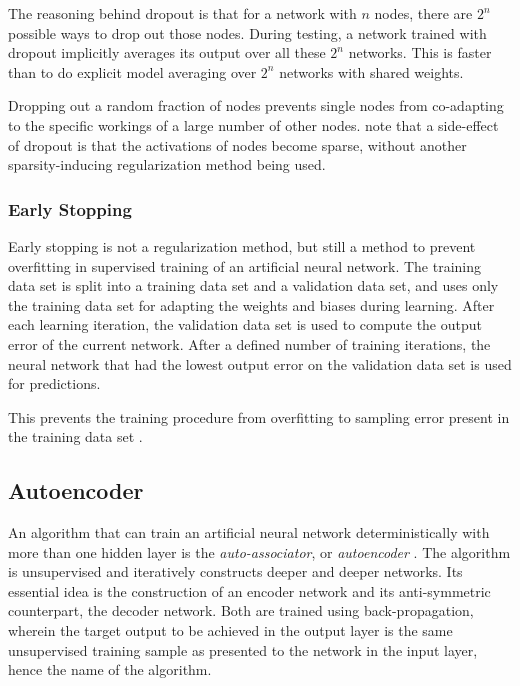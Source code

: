 The reasoning behind dropout is that for a network with $n$ nodes,
there are $2^{n}$ possible ways to drop out those nodes. During testing,
a network trained with dropout implicitly averages its output over
all these $2^{n}$ networks. This is faster than to do explicit model
averaging over $2^{n}$ networks with shared weights.

Dropping out a random fraction of nodes prevents single nodes from
co-adapting to the specific workings of a large number of other nodes.
\cite{SrivastavaSalakhutdinov2014} note that a side-effect of dropout
is that the activations of nodes become sparse, without another sparsity-inducing
regularization method being used.


\subsubsection{Early Stopping\label{subsec:Early-stopping}}

Early stopping is not a regularization method,
but still a method to prevent overfitting in supervised training of
an artificial neural network. The training data set is split into
a training data set and a validation data set, and uses only the training
data set for adapting the weights and biases during learning. After
each learning iteration, the validation data set is used to compute
the output error of the current network. After a defined number of
training iterations, the neural network that had the lowest output
error on the validation data set is used for predictions.

This prevents the training procedure from overfitting to sampling
error present in the training data set \cite{Prechelt1997}.

\subsection{Autoencoder}

An algorithm that can train an artificial neural network deterministically
with more than one hidden layer is the \emph{auto-associator},
or \emph{autoencoder} \cite{BengioLarochelle2007}.
The algorithm is unsupervised and iteratively constructs deeper and
deeper networks. Its essential idea is the construction of an encoder
network and its anti-symmetric counterpart, the decoder network. Both
are trained using back-propagation, wherein the target output to be
achieved in the output layer is the same unsupervised training sample
as presented to the network in the input layer, hence the name of
the algorithm.

